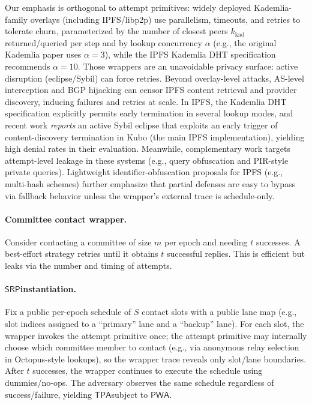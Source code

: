 \documentclass[11pt]{article}
\newcommand{\PWA}{\ensuremath{\mathsf{PWA}}}
\newcommand{\TPA}{\ensuremath{\mathsf{TPA}}}
\newcommand{\SRP}{\ensuremath{\mathsf{SRP}}}
\begin{document}
Our emphasis is orthogonal to attempt primitives: widely deployed Kademlia-family overlays (including IPFS/libp2p) use parallelism, timeouts, and retries to tolerate churn\cite{maymounkovMazieresKademlia2002}, parameterized by the number of closest peers $k_{\mathrm{kad}}$ returned/queried per step and by lookup concurrency $\alpha$ (e.g., the original Kademlia paper uses $\alpha=3$), while the IPFS Kademlia DHT specification recommends $\alpha=10$.\cite{maymounkovMazieresKademlia2002,ipfsKadDHTSpec2025}
Those wrappers are an unavoidable privacy surface: active disruption (eclipse/Sybil) can force retries\cite{singhEclipseInfocom2006,zhangEclipseInfeasible2011,ipfsContentCensorshipNDSS2024}.
Beyond overlay-level attacks, AS-level interception and BGP hijacking can censor IPFS content retrieval and provider discovery, inducing failures and retries at scale.\cite{matterTranIPFSCensorship2025}
In IPFS, the Kademlia DHT specification explicitly permits early termination in several lookup modes, and recent work \emph{reports} an active Sybil eclipse that exploits an early trigger of content-discovery termination in Kubo (the main IPFS implementation), yielding high denial rates in their evaluation.\cite{ipfsKadDHTSpec2025,ipfsActiveSybil2025}
Meanwhile, complementary work targets attempt-level leakage in these systems (e.g., query obfuscation and PIR-style private queries)\cite{danielKademliaObfuscation2025,mazmudarPeer2PIR2025}.
Lightweight identifier-obfuscation proposals for IPFS (e.g., multi-hash schemes) further emphasize that partial defenses are easy to bypass via fallback behavior unless the wrapper's external trace is schedule-only.\cite{katsantasTripleHashing2024,danielBitswapForwarding2023}

\paragraph{Committee contact wrapper.}
Consider contacting a committee of size $m$ per epoch and needing $t$ successes.
A best-effort strategy retries until it obtains $t$ successful replies.
This is efficient but leaks via the number and timing of attempts.

\paragraph{\SRP instantiation.}
Fix a public per-epoch schedule of $S$ contact slots with a public lane map (e.g., slot indices assigned to a ``primary'' lane and a ``backup'' lane).
For each slot, the wrapper invokes the attempt primitive once; the attempt primitive may internally choose which committee member to contact (e.g., via anonymous relay selection in Octopus-style lookups), so the wrapper trace reveals only slot/lane boundaries.
After $t$ successes, the wrapper continues to execute the schedule using dummies/no-ops.
The adversary observes the same schedule regardless of success/failure, yielding \TPA subject to \PWA.
\end{document}
